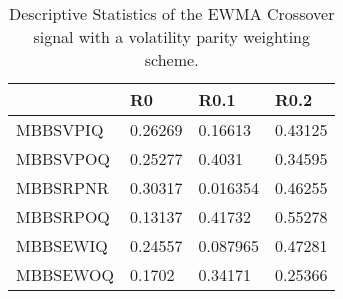 \begin{table}[H]
\centering
\begin{tabular}{llll}
& R0 & R0.1 & R0.2 \\ 
\hline 
MBBSVPIQ & 0.26269 & 0.16613 & 0.43125 \\ 
MBBSVPOQ & 0.25277 & 0.4031 & 0.34595 \\ 
MBBSRPNR & 0.30317 & 0.016354 & 0.46255 \\ 
MBBSRPOQ & 0.13137 & 0.41732 & 0.55278 \\ 
MBBSEWIQ & 0.24557 & 0.087965 & 0.47281 \\ 
MBBSEWOQ & 0.1702 & 0.34171 & 0.25366 \\ 
\hline
\end{tabular}
\caption{Descriptive Statistics of the EWMA Crossover signal with a volatility parity weighting scheme.}
\label{MBBS_corrregime}
\end{table}